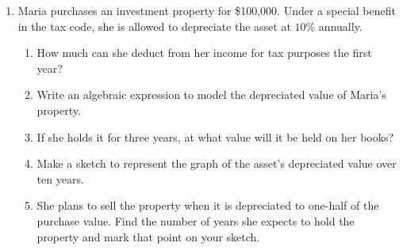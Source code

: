 \documentclass[12pt, twoside]{article}
\begin{document}
\begin{enumerate}
\item Maria purchases an investment property for \$100,000. Under a special benefit in the tax code, she is allowed to depreciate the asset at $10\%$ annually. 
\begin{enumerate}[itemsep=1cm]
    \item How much can she deduct from her income for tax purposes the first year?
    \item Write an algebraic expression to model the depreciated value of Maria's property.
    \item If she holds it for three years, at what value will it be held on her books?
    \item Make a sketch to represent the graph of the asset's depreciated value over ten years. \vspace{3cm}
    \item She plans to sell the property when it is depreciated to one-half of the purchase value. Find the number of years she expects to hold the property and mark that point on your sketch.
\end{enumerate}
\vspace{2cm}



\end{enumerate}
\end{document}
